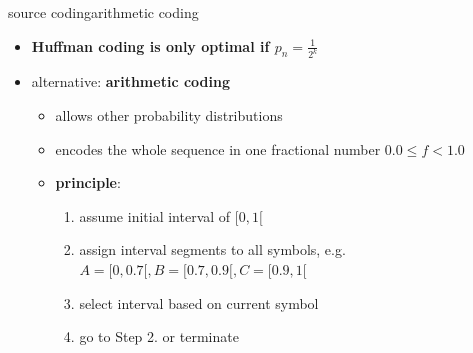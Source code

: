	\begin{frame}{source coding}{arithmetic coding}
		\begin{itemize}
			\item	\textbf{Huffman coding is only optimal if $p_n = \frac{1}{2^k}$}
			\pause
            \bigskip
			\item	alternative: \textbf{arithmetic coding} 
                \begin{itemize}
                    \item   allows other probability distributions
                    \item   encodes the whole sequence in one fractional number $0.0 \leq f < 1.0$
                    \pause
                    \bigskip
                    \item   \textbf{principle}: 
                        \begin{enumerate}
                            \item   assume initial interval of $[0,1[$ 
                            \pause
                            \item   assign interval segments to all symbols, e.g. $A = [0,0.7[, B= [0.7,0.9[, C=[0.9,1[$
                            \pause
                            \item   select interval based on current symbol
                            \pause
                            \item	go to Step 2. or terminate
                        \end{enumerate}
                \end{itemize}
		\end{itemize}
	\end{frame}
	

